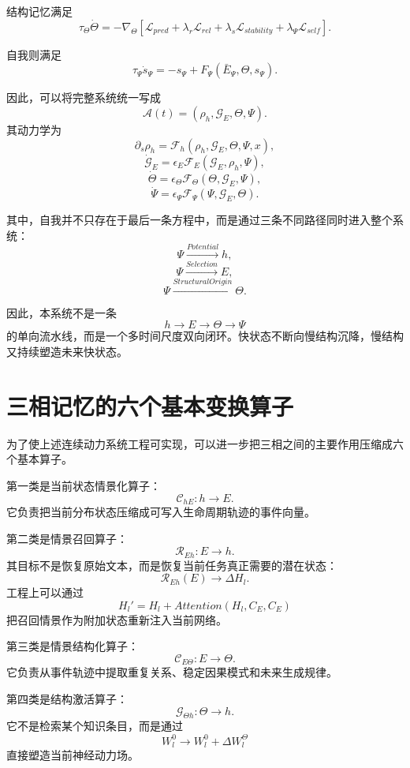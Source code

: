 结构记忆满足
\[
\tau_\Theta
\dot\Theta
=
-
\nabla_\Theta
\left[
\mathcal{L}_{pred}
+
\lambda_r\mathcal{L}_{rel}
+
\lambda_s\mathcal{L}_{stability}
+
\lambda_\Psi\mathcal{L}_{self}
\right].
\]

自我则满足
\[
\tau_\Psi
\dot s_\Psi
=
-s_\Psi
+
F_\Psi
\left(
\bar E_\Psi,\Theta,s_\Psi
\right).
\]

因此，可以将完整系统统一写成
\[
\boxed{
\mathcal{A}(t)
=
\left(
\rho_h,
\mathcal{G}_E,
\Theta,
\Psi
\right).
}
\]
其动力学为
\[
\partial_s\rho_h
=
\mathcal{F}_h
\left(
\rho_h,\mathcal{G}_E,\Theta,\Psi,x
\right),
\]
\[
\dot{\mathcal{G}}_E
=
\epsilon_E
\mathcal{F}_E
\left(
\mathcal{G}_E,\rho_h,\Psi
\right),
\]
\[
\dot\Theta
=
\epsilon_\Theta
\mathcal{F}_\Theta
\left(
\Theta,\mathcal{G}_E,\Psi
\right),
\]
\[
\dot\Psi
=
\epsilon_\Psi
\mathcal{F}_\Psi
\left(
\Psi,\mathcal{G}_E,\Theta
\right).
\]

其中，自我并不只存在于最后一条方程中，而是通过三条不同路径同时进入整个系统：
\[
\Psi
\xrightarrow{Potential}
h,
\]
\[
\Psi
\xrightarrow{Selection}
E,
\]
\[
\Psi
\xrightarrow{StructuralOrigin}
\Theta.
\]

因此，本系统不是一条
\[
h\rightarrow E\rightarrow\Theta\rightarrow\Psi
\]
的单向流水线，而是一个多时间尺度双向闭环。快状态不断向慢结构沉降，慢结构又持续塑造未来快状态。

\section{三相记忆的六个基本变换算子}

为了使上述连续动力系统工程可实现，可以进一步把三相之间的主要作用压缩成六个基本算子。

第一类是当前状态情景化算子：
\[
\mathcal{C}_{hE}:
h
\rightarrow
E.
\]
它负责把当前分布状态压缩成可写入生命周期轨迹的事件向量。

第二类是情景召回算子：
\[
\mathcal{R}_{Eh}:
E
\rightarrow
h.
\]
其目标不是恢复原始文本，而是恢复当前任务真正需要的潜在状态：
\[
\mathcal{R}_{Eh}(E)
\rightarrow
\Delta H_l.
\]
工程上可以通过
\[
H_l'
=
H_l
+
Attention
\left(
H_l,C_E,C_E
\right)
\]
把召回情景作为附加状态重新注入当前网络。

第三类是情景结构化算子：
\[
\mathcal{C}_{E\Theta}:
E
\rightarrow
\Theta.
\]
它负责从事件轨迹中提取重复关系、稳定因果模式和未来生成规律。

第四类是结构激活算子：
\[
\mathcal{G}_{\Theta h}:
\Theta
\rightarrow
h.
\]
它不是检索某个知识条目，而是通过
\[
W_l^0
\rightarrow
W_l^0+\Delta W_l^\Theta
\]
直接塑造当前神经动力场。

